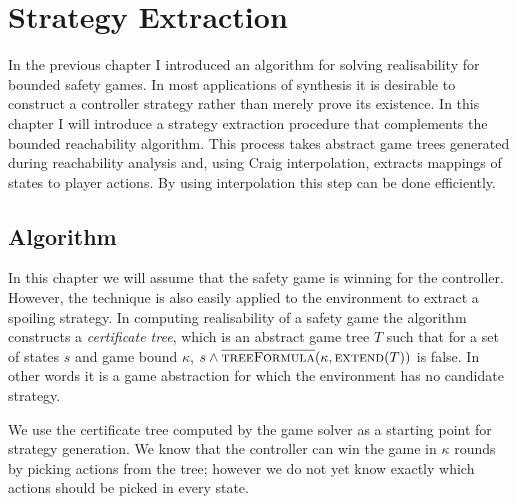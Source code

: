 \chapter{Strategy Extraction}
\label{ch:strategy}

\newcommand{\strategyext}[0]{\textsc{StrategyGen}\xspace}
\newcommand{\genstrategy}{\textsc{StrategyGen}}
\newcommand{\strategy}[0]{\textsc{Strategy}\xspace}
\newcommand{\partition}[0]{\textsc{Partition}\xspace}
\newcommand{\nextf}[0]{\textsc{Next}\xspace}
\newcommand{\ogametree}[0]{\mbox{\sc OppGT}}
\newcommand{\eagametree}[0]{\mbox{\sc AbsGT}'}
\newcommand{\pgametree}[0]{\mbox{\sc Cand}}
\newcommand{\apgametree}[0]{\mbox{\sc AbsSolvedGT}}
\newcommand{\opgametree}[0]{\mbox{\sc Spoiling}}

\renewcommand{\ss}[0]{\mathbf{s}}
\newcommand{\cc}[0]{\mathbf{c}}
\newcommand{\uu}[0]{\mathbf{u}}

\newtheorem{theorem}{Theorem}
\newtheorem{example}{Example}
\newtheorem{proposition}{Proposition}

In the previous chapter I introduced an algorithm for solving realisability for bounded safety games. In most applications of synthesis it is desirable to construct a controller strategy rather than merely prove its existence. In this chapter I will introduce a strategy extraction procedure that complements the bounded reachability algorithm. This process takes abstract game trees generated during reachability analysis and, using Craig interpolation, extracts mappings of states to player actions. By using interpolation this step can be done efficiently.

\section{Algorithm}

In this chapter we will assume that the safety game is winning for the controller. However, the technique is also easily applied to the environment to extract a spoiling strategy. In computing realisability of a safety game the algorithm constructs a \emph{certificate tree}, which is an abstract game tree $T$ such that for a set of states $s$ and game bound $\kappa$, $s \land \textsc{$\overline{\mbox{treeFormula}}$}(\kappa, \textsc{extend}(T))$ is false. In other words it is a game abstraction for which the environment has no candidate strategy.

We use the certificate tree computed by the game solver as a starting point for strategy generation.  We know that the controller can win the game in $\kappa$ rounds by picking actions from the tree; however we do not yet know exactly which actions should be picked in every state.

